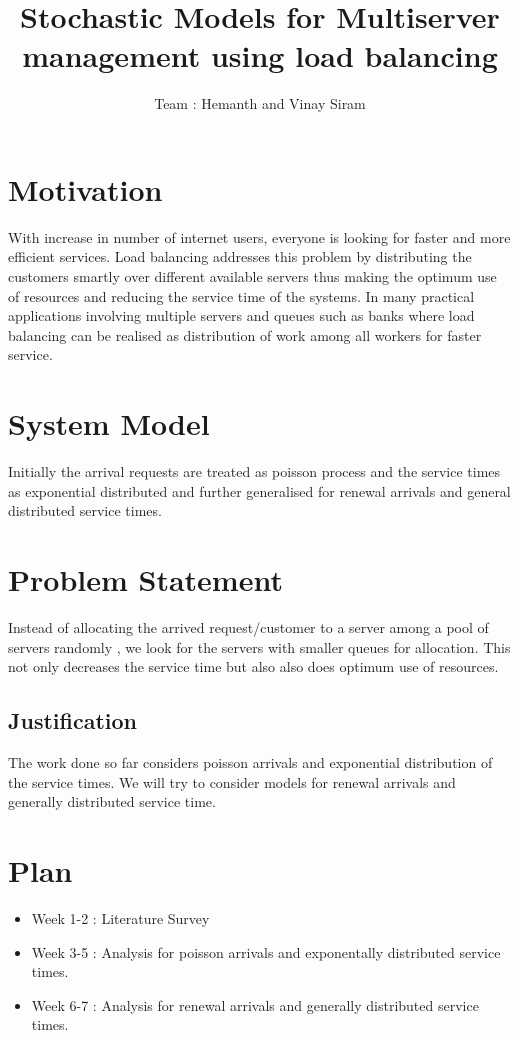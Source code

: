 \documentclass[a4paper,english,12pt]{article}
\title{Stochastic Models for Multiserver management using load balancing}
\author{Team : Hemanth and Vinay Siram}
\begin{document}
\maketitle

\section{Motivation}
With increase in number of internet users, everyone is looking for faster and more efficient services. Load balancing addresses this problem by distributing the customers smartly over different available servers thus making the optimum use of resources and reducing the service time of the systems.   
In many practical applications involving multiple servers and queues such as banks where load balancing can be realised as distribution of work among all workers for faster service.\\

 \section{System Model}
Initially the arrival requests are treated as poisson process and the service times as exponential distributed and further generalised for renewal arrivals and general distributed service times.
\section{Problem Statement}
Instead of allocating the arrived request/customer to a server among a pool of servers randomly , we look for the servers with smaller queues for allocation. This not only decreases the service time but also also does optimum use of resources.  
\subsection{Justification}
The work done so far considers poisson arrivals and exponential distribution of the service times. We will try to consider models for renewal arrivals and generally 
distributed service time.\\
\section{Plan}
\begin{itemize}
	\item Week 1-2   :  Literature Survey  
	\item Week 3-5   :  Analysis for poisson arrivals and exponentally distributed service times.
	\item Week 6-7   :  Analysis for renewal arrivals and generally distributed service times.  
\end{itemize}
\end{document}
